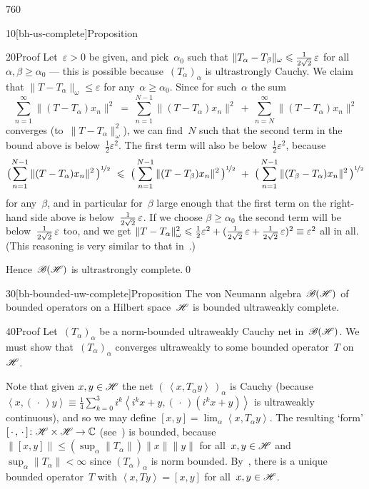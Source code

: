 \begin{parsec}{760}
\begin{point}{10}[bh-us-complete]{Proposition}
\begin{point}{20}{Proof}
Let~$\varepsilon>0$ be given,
and pick~$\alpha_0$
such that $\|T_\alpha-T_\beta\|_\omega \leq 
\smash{\frac{1}{2\sqrt{2}}}\,\varepsilon$
for all~$\alpha,\beta\geq \alpha_0$
--- this is possible  because~$(T_\alpha)_\alpha$ is ultrastrongly Cauchy.
We claim that $\|T-T_\alpha\|_\omega \leq \varepsilon$
for any~$\alpha\geq \alpha_0$.
Since for such~$\alpha$
the sum
\begin{equation*}
	\sum_{n=1}^\infty \|(T-T_\alpha)x_n\|^2 
	\ = \ 
	\sum_{n=1}^{N-1} \|(T-T_\alpha)x_n\|^2
	\ +\ 
	\sum_{n=N}^\infty
	\|(T-T_\alpha)x_n\|^2
\end{equation*}
converges (to~$\|T-T_\alpha\|_\omega^2$),
we can find~$N$ such that the second term in the bound above
is below~$\frac{1}{2}\varepsilon^2$.
The first term will also be below~$\frac{1}{2}\varepsilon^2$,
because
\begin{equation*}
	\bigl(\sum_{n=1}^{N-1} \|(T - T_\alpha)x_n\|^2\,\bigr)^{\nicefrac{1}{2}}
	\ \leq\ 
\bigl(\,
\sum_{n=1}^{N-1} \|(T-T_{\beta})x_n\|^2
\,\bigr)^{\nicefrac{1}{2}}
\ +\ 
\bigl(\,
\sum_{n=1}^{N-1} \|(T_\beta-T_\alpha)x_n\|^2
\,\bigr)^{\nicefrac{1}{2}}
\end{equation*}
for any~$\beta$,
and in particular for~$\beta$
large enough that the first term on the right-hand side above
is below~$\smash{\frac{1}{2\sqrt{2}}}\,\varepsilon$.
If we choose $\beta\geq \alpha_0$
the second term will be below~$\smash{\frac{1}{2\sqrt{2}}}\,\varepsilon$ too,
and we get $\|T-T_\alpha\|_\omega^2 \leq \frac{1}{2}\varepsilon^2
+ (\smash{\frac{1}{2\sqrt{2}}\,\varepsilon 
+ \frac{1}{2\sqrt{2}}\,\varepsilon})^2
\equiv \varepsilon^2$ 
all in all.
(This reasoning is very similar to that in~.)

Hence~$\scrB(\scrH)$ is ultrastrongly complete.\qed
\end{point}
\end{point}
\begin{point}{30}[bh-bounded-uw-complete]{Proposition}%
The von Neumann algebra~$\scrB(\scrH)$
of bounded operators on a Hilbert space~$\scrH$
is bounded ultraweakly complete.
\begin{point}{40}{Proof}%
Let~$(T_\alpha)_\alpha$ be a norm-bounded ultraweakly Cauchy net
in~$\scrB(\scrH)$.
We must show that~$(T_\alpha)_\alpha$
converges ultraweakly
to some bounded operator~$T$ on~$\scrH$.

Note that given $x,y\in\scrH$
the net $(\,\left<x,T_\alpha y\right>\,)_\alpha$
is Cauchy
(because $\left<x,(\,\cdot\,)y\right>
\equiv \frac{1}{4}\sum_{k=0}^3 i^k\left<i^kx+y,(\,\cdot\,)(i^kx+y)\right>$
is ultraweakly continuous),
and so we may define $[x,y] = \lim_\alpha \left<x,T_\alpha y\right>$.
The resulting `form'
$[\,\cdot\,,\,\cdot\,]\colon \scrH\times\scrH\to \C$
(see~\sref{chilb-form})
is bounded, 
because~$\left\|[x,y]\right\| \leq (\sup_\alpha \|T_\alpha\|)\|x\|\|y\|$
for all~$x,y\in\scrH$
and $\sup_\alpha\|T_\alpha\|<\infty$
since $(T_\alpha)_\alpha$
is norm bounded.
By~,
there is a unique bounded operator~$T$
with $\left<x,Ty\right>=[x,y]$
for all~$x,y\in\scrH$.


\end{point}
\end{point}
\end{parsec}
